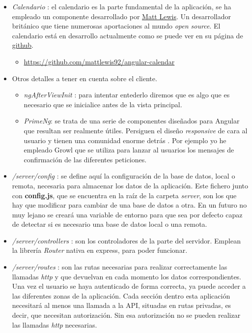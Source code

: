 \begin{itemize}
\item \emph{Calendario} : el calendario es la parte fundamental de la aplicación, se ha empleado un componente desarrollado por \href{https://mattlewis.me/}{Matt Lewis}. Un desarrollador británico que tiene numerosas aportaciones al mundo \emph{open source}. El calendario está en desarrollo actualmente como se puede ver en su página de \href{https://github.com/mattlewis92/angular-calendar}{github}. 
\begin{itemize}
\item \url{https://github.com/mattlewis92/angular-calendar}
\end{itemize}



\item Otros detalles a tener en cuenta sobre el cliente.
\begin{itemize}
	\item \emph{ngAfterViewInit} \cite{afterview} : para intentar entederlo diremos que es algo que es necesario que se inicialice antes de la vista principal. 
	\item \emph{PrimeNg}: se trata de una serie de componentes diseñados para Angular que resultan ser realmente útiles. Persiguen el diseño \emph{responsive} de cara al usuario y tienen una comunidad enorme detrás \cite{prime}. Por ejemplo yo he empleado Growl \cite{growl} que se utiliza para lanzar al usuarios los mensajes de confirmación de las diferentes peticiones.  
\end{itemize}

\item\emph{/server/config} : se define aquí la configuración de la base de datos, local o remota, necesaria para almacenar los datos de la aplicación. Este fichero junto con \textbf{config.js}, que se encuentra en la raíz de la carpeta \emph{server}, son los que hay que modificar para cambiar de una base de datos a otra. En un futuro no muy lejano se creará una variable de entorno para que sea por defecto capaz de detectar si es necesario una base de datos local o una remota. 

\item\emph{/server/controllers} : son los controladores de la parte del servidor. Emplean la librería  \emph{Router} \cite{router} nativa en express, para poder funcionar.


\item\emph{/server/routes} : son las rutas necesarias para realizar correctamente las llamadas \emph{http}  y que devuelvan en cada momento los datos correspondientes. Una vez el usuario se haya autenticado de forma correcta, ya puede acceder a las diferentes zonas de la aplicación. Cada sección dentro esta aplicación necesitará al menos una llamada a la API, situadas en rutas privadas, es decir, que necesitan autorización. Sin esa autorización no se pueden realizar las llamadas \emph{http} necesarias. 


\end{itemize}
